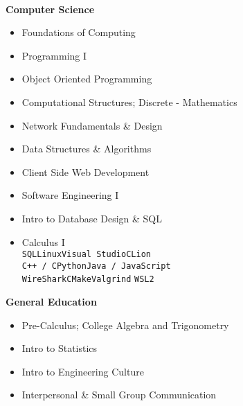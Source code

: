 \documentclass[9pt]{developercv}
\begin{document}
\begin{minipage}[t]{0.49\textwidth}
\begin{itemize}[itemsep=2pt,topsep=0pt,parsep=0pt,partopsep=0pt, leftmargin=2em]
\end{itemize}
\\
    \begin{minipage}[t]{.02\textwidth}
    \end{minipage}
    \hfill
     \begin{minipage}[t]{.98\textwidth}
    \textbf{Computer Science}
    \begin{itemize}[itemsep=3pt,topsep=4pt,parsep=0pt,partopsep=0pt, leftmargin=2em]
        \item Foundations of Computing
        \item Programming I
        \item Object Oriented Programming
        \item Computational Structures; Discrete - Mathematics
        \item Network Fundamentals \& Design
        \item Data Structures \& Algorithms
         \item Client Side Web Development
         \item Software Engineering I
         \item Intro to Database Design \& SQL
         \item Calculus I \\
         \texttt{SQL}\slashsep\texttt{Linux}\slashsep\texttt{Visual Studio}\slashsep \texttt{CLion}\\\texttt{C++ / C}\slashsep\texttt{Python}\slashsep\texttt{Java / JavaScript}\\\texttt{WireShark}\slashsep\texttt{CMake}\slashsep \texttt{Valgrind} \slashsep \texttt{WSL2}
    \end{itemize}
    \vspace{4mm}
    \textbf{General Education}
    \begin{itemize}[itemsep=3pt,topsep=4pt,parsep=0pt,partopsep=0pt, leftmargin=2em]
         \item Pre-Calculus; College Algebra and Trigonometry
         \item Intro to Statistics
         \item Intro to Engineering Culture
         \item Interpersonal \& Small Group Communication
    \end{itemize}
    \end{minipage}
\end{minipage}
\hfill
\end{document}
